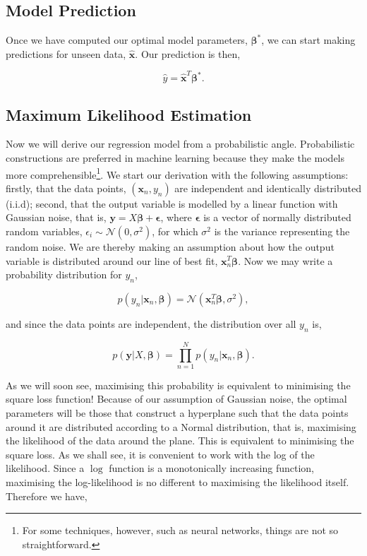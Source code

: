 \documentclass[11pt]{amsart}
\begin{document}
\subsection{Model Prediction}

Once we have computed our optimal model parameters, $\boldsymbol\beta^*$, we can start making predictions for unseen data, $\hat{\mathbf{x}}$. Our prediction is then,

$$\hat{y} = \hat{\mathbf{x}}^T\boldsymbol\beta^*.$$

\subsection{Maximum Likelihood Estimation}

Now we will derive our regression model from a probabilistic angle. Probabilistic constructions are preferred in machine learning because they make the models more comprehensible\footnote{For some techniques, however, such as neural networks, things are not so straightforward.}. We start our derivation with the following assumptions: firstly, that the data points, $(\mathbf{x}_n, y_n)$ are independent and identically distributed (i.i.d); second, that the output variable is modelled by a linear function with Gaussian noise, that is, $\mathbf{y} = X\boldsymbol\beta + \boldsymbol\epsilon$, where $\boldsymbol\epsilon$ is a vector of normally distributed random variables, $\epsilon_i \sim \mathcal{N}(0, \sigma^2)$, for which $\sigma^2$ is the variance representing the random noise. We are thereby making an assumption about how the output variable is distributed around our line of best fit, $\mathbf{x}_n^T\boldsymbol\beta$. Now we may write a probability distribution for $y_n$,

$$p(y_n|\mathbf{x}_n, \boldsymbol\beta) = \mathcal{N}(\mathbf{x}_n^T\boldsymbol\beta, \sigma^2),$$

and since the data points are independent, the distribution over all $y_n$ is,

$$p(\mathbf{y}|X, \boldsymbol\beta) = \prod_{n=1}^N p(y_n|\mathbf{x}_n, \boldsymbol\beta).$$

As we will soon see, maximising this probability is equivalent to minimising the square loss function! Because of our assumption of Gaussian noise, the optimal parameters will be those that construct a hyperplane such that the data points around it are distributed according to a Normal distribution, that is, maximising the likelihood of the data around the plane. This is equivalent to minimising the square loss. As we shall see, it is convenient to work with the log of the likelihood. Since a $\log$ function is a monotonically increasing function, maximising the log-likelihood is no different to maximising the likelihood itself. Therefore we have,
\end{document}
